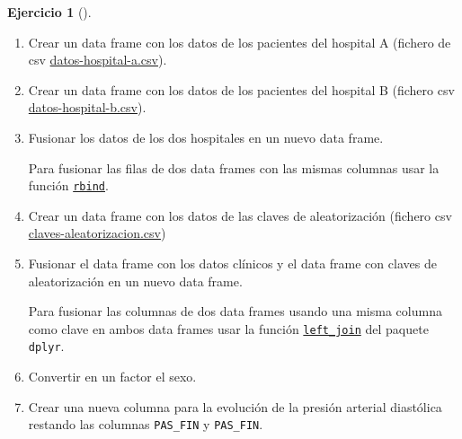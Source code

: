 \documentclass[
  a4paper,
]{scrreport}
\theoremstyle{definition}
\newtheorem{exercise}{Ejercicio}[chapter]
\theoremstyle{remark}
\begin{document}
\begin{exercise}[]
\begin{enumerate}
\def\labelenumi{\alph{enumi}.}
\item
  Crear un data frame con los datos de los pacientes del hospital A
  (fichero de csv
  \href{datos/hipertension/datos-hospital-a.csv}{datos-hospital-a.csv}).
\item
  Crear un data frame con los datos de los pacientes del hospital B
  (fichero csv
  \href{datos/hipertension/datos-hospital-b.csv}{datos-hospital-b.csv}).
\item
  Fusionar los datos de los dos hospitales en un nuevo data frame.

  \begin{tcolorbox}[enhanced jigsaw, toprule=.15mm, rightrule=.15mm, arc=.35mm, colback=white, colbacktitle=quarto-callout-note-color!10!white, toptitle=1mm, left=2mm, colframe=quarto-callout-note-color-frame, opacityback=0, breakable, opacitybacktitle=0.6, bottomtitle=1mm, titlerule=0mm, title=\textcolor{quarto-callout-note-color}{\faInfo}\hspace{0.5em}{Ayuda}, bottomrule=.15mm, coltitle=black, leftrule=.75mm]

  Para fusionar las filas de dos data frames con las mismas columnas
  usar la función
  \href{https://aprendeconalf.es/manual-r/03-tipos-datos-estructurados.html\#a\%C3\%B1adir-elementos-a-un-data-frame}{\texttt{rbind}}.

  \end{tcolorbox}
\item
  Crear un data frame con los datos de las claves de aleatorización
  (fichero csv
  \href{datos/hipertension/claves-aleatorizacion.csv}{claves-aleatorizacion.csv})
\item
  Fusionar el data frame con los datos clínicos y el data frame con
  claves de aleatorización en un nuevo data frame.

  \begin{tcolorbox}[enhanced jigsaw, toprule=.15mm, rightrule=.15mm, arc=.35mm, colback=white, colbacktitle=quarto-callout-note-color!10!white, toptitle=1mm, left=2mm, colframe=quarto-callout-note-color-frame, opacityback=0, breakable, opacitybacktitle=0.6, bottomtitle=1mm, titlerule=0mm, title=\textcolor{quarto-callout-note-color}{\faInfo}\hspace{0.5em}{Ayuda}, bottomrule=.15mm, coltitle=black, leftrule=.75mm]

  Para fusionar las columnas de dos data frames usando una misma columna
  como clave en ambos data frames usar la función
  \href{https://dtplyr.tidyverse.org/reference/left_join.dtplyr_step.html}{\texttt{left\_join}}
  del paquete \texttt{dplyr}.

  \end{tcolorbox}
\item
  Convertir en un factor el sexo.
\item
  Crear una nueva columna para la evolución de la presión arterial
  diastólica restando las columnas \texttt{PAS\_FIN} y
  \texttt{PAS\_FIN}.
\end{enumerate}

\end{exercise}
\end{document}

